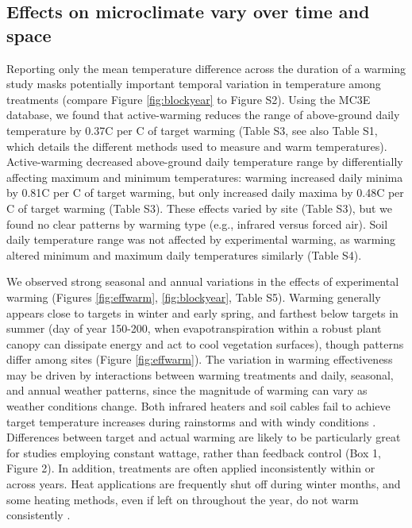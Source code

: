 \documentclass{article}
\begin{document}
\subsection* {Effects on microclimate vary over time and space}
Reporting only the mean temperature difference across the duration of a warming study masks potentially important temporal variation in temperature among treatments (compare Figure \ref{fig:blockyear} to Figure S2). Using the MC3E database, we found that active-warming reduces the range of above-ground daily temperature by 0.37\degree C per \degree C of target warming (Table S3, see also Table S1, which details the different methods used to measure and warm temperatures). Active-warming decreased above-ground daily temperature range by differentially affecting maximum and minimum temperatures: warming increased daily minima by 0.81\degree C per \degree C of target warming, but only increased daily maxima by 0.48\degree C per \degree C of target warming (Table S3). These effects varied by site (Table S3), but we found no clear patterns by warming type (e.g., infrared versus forced air). Soil daily temperature range was not affected by experimental warming, as warming altered minimum and maximum daily temperatures similarly (Table S4).

\par We observed strong seasonal and annual variations in the effects of experimental warming (Figures \ref{fig:effwarm}, \ref{fig:blockyear}, Table S5). Warming generally appears close to targets in winter and early spring, and farthest below targets in summer (day of year 150-200, when evapotranspiration within a robust plant canopy can dissipate energy and act to cool vegetation surfaces), though patterns differ among sites (Figure \ref{fig:effwarm}). 
The variation in warming effectiveness may be driven by interactions between warming treatments and daily, seasonal, and annual weather patterns, since the magnitude of warming can vary as weather conditions change. Both infrared heaters and soil cables fail to achieve target temperature increases during rainstorms \citep{peterjohn1993,hoeppner2012} and with windy conditions \citep{kimball2005,kimball2008}. Differences between target and actual warming are likely to be particularly great for studies employing constant wattage, rather than feedback control (Box 1, Figure 2). In addition, treatments are often applied inconsistently within or across years. Heat applications are frequently shut off during winter months, and some heating methods, even if left on throughout the year, do not warm consistently \citep[e.g.,][]{clark2014a,clark2014b,hagedorn2010}.
\end{document}
